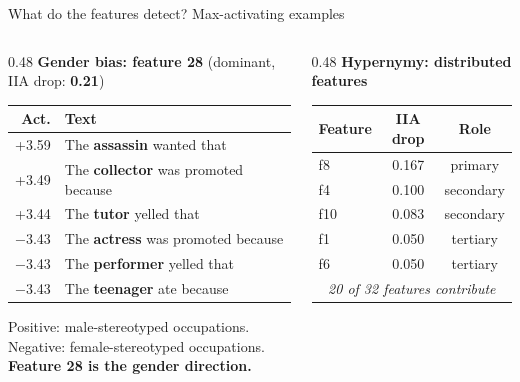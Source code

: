 \documentclass[aspectratio=169,11pt]{beamer}
\begin{document}
\begin{frame}{What do the features detect? Max-activating examples}
\vspace{-0.5em}

\begin{columns}[T]
\begin{column}{0.48\textwidth}
{\small\textbf{Gender bias: feature 28} (dominant, IIA drop: \textbf{0.21})}

\vspace{0.2em}
{\scriptsize
\renewcommand{\arraystretch}{1.1}
\begin{tabular}{@{}r l@{}}
\toprule
\textbf{Act.} & \textbf{Text} \\
\midrule
\textcolor{das}{+3.59} & The \textbf{assassin} wanted that \\
\textcolor{das}{+3.49} & The \textbf{collector} was promoted because \\
\textcolor{das}{+3.44} & The \textbf{tutor} yelled that \\
\midrule
\textcolor{circle}{$-$3.43} & The \textbf{actress} was promoted because \\
\textcolor{circle}{$-$3.43} & The \textbf{performer} yelled that \\
\textcolor{circle}{$-$3.43} & The \textbf{teenager} ate because \\
\bottomrule
\end{tabular}
}

\vspace{0.2em}
{\scriptsize \textcolor{das}{Positive}: male-stereotyped occupations.\\
\textcolor{circle}{Negative}: female-stereotyped occupations.\\[0.1em]
\textbf{Feature 28 is the gender direction.}}
\end{column}
\begin{column}{0.48\textwidth}
{\small\textbf{Hypernymy: distributed features}}

\vspace{0.2em}
{\scriptsize
\renewcommand{\arraystretch}{1.0}
\begin{tabular}{@{}lcc@{}}
\toprule
\textbf{Feature} & \textbf{IIA drop} & \textbf{Role} \\
\midrule
f8  & 0.167 & primary \\
f4  & 0.100 & secondary \\
f10 & 0.083 & secondary \\
f1  & 0.050 & tertiary \\
f6  & 0.050 & tertiary \\
\midrule
\multicolumn{3}{c}{\textit{20 of 32 features contribute}} \\
\bottomrule
\end{tabular}
}


\end{column}
\end{columns}
\end{frame}
\end{document}
